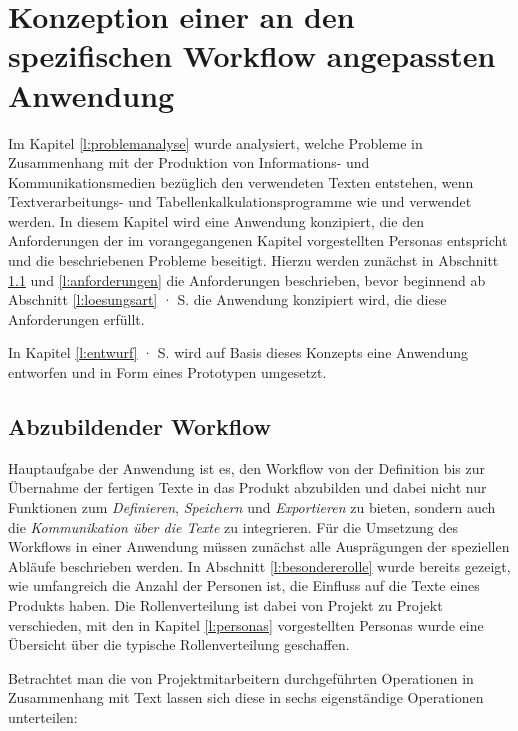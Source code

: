 \section{Konzeption einer an den spezifischen Workflow angepassten Anwendung}\label{l:konzeption}

Im Kapitel \ref{l:problemanalyse} wurde analysiert, welche Probleme in Zusammenhang mit der Produktion von Informations- und Kommunikationsmedien bezüglich den verwendeten Texten entstehen, wenn Textverarbeitungs- und Tabellenkalkulationsprogramme wie  und  verwendet werden. In diesem Kapitel wird eine Anwendung konzipiert, die den Anforderungen der im vorangegangenen Kapitel vorgestellten Personas entspricht und die beschriebenen Probleme beseitigt. Hierzu werden zunächst in Abschnitt \ref{l:workflow} und \ref{l:anforderungen} die Anforderungen beschrieben, bevor beginnend ab Abschnitt \ref{l:loesungsart} · S.\pageref{l:loesungsart} die Anwendung konzipiert wird, die diese Anforderungen erfüllt. 

\bigskip

In Kapitel \ref{l:entwurf} · S.\pageref{l:entwurf} wird auf Basis dieses Konzepts eine Anwendung entworfen und in Form eines Prototypen umgesetzt.

\subsection{Abzubildender Workflow}\label{l:workflow}

Hauptaufgabe der Anwendung ist es, den Workflow von der Definition bis zur Übernahme der fertigen Texte in das Produkt abzubilden und dabei nicht nur Funktionen zum \emph{Definieren}, \emph{Speichern} und \emph{Exportieren} zu bieten, sondern auch die \emph{Kommunikation über die Texte} zu integrieren. Für die Umsetzung des Workflows in einer Anwendung müssen zunächst alle Ausprägungen der speziellen Abläufe beschrieben werden. In Abschnitt \ref{l:besondererolle} wurde bereits gezeigt, wie umfangreich die Anzahl der Personen ist, die Einfluss auf die Texte eines Produkts haben. Die Rollenverteilung ist dabei von Projekt zu Projekt verschieden, mit den in Kapitel \ref{l:personas} vorgestellten Personas wurde eine Übersicht über die typische Rollenverteilung geschaffen. 

Betrachtet man die von Projektmitarbeitern durchgeführten Operationen in Zusammenhang mit Text lassen sich diese in sechs eigenständige Operationen unterteilen:

